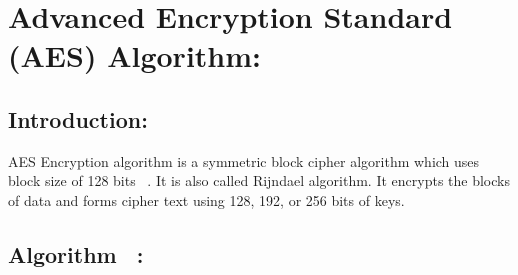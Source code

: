 \documentclass[a4paper]{report} %
\begin{document}
\newpage

\section{Advanced Encryption Standard (AES) Algorithm:}
\subsection{Introduction:} 
AES Encryption algorithm is a symmetric block cipher algorithm which uses block size of 128 bits ~\cite{simplilearn1}. It is also called Rijndael algorithm. It encrypts the blocks of data and forms cipher text using 128, 192, or 256 bits of keys. ~\cite{simplilearn1}

\subsection{Algorithm ~\cite{AES_Lecture}:}
\end{document}
